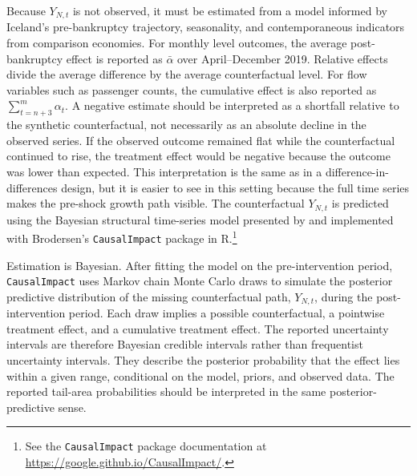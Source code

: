 \documentclass[12pt]{article}
\begin{document}
Because $Y_{N,t}$ is not observed, it must be estimated from a model informed by Iceland's pre-bankruptcy trajectory, seasonality, and contemporaneous indicators from comparison economies. For monthly level outcomes, the average post-bankruptcy effect is reported as $\bar{\alpha}$ over April--December 2019. Relative effects divide the average difference by the average counterfactual level. For flow variables such as passenger counts, the cumulative effect is also reported as $\sum_{t=n+3}^{m} \alpha_t$. A negative estimate should be interpreted as a shortfall relative to the synthetic counterfactual, not necessarily as an absolute decline in the observed series. If the observed outcome remained flat while the counterfactual continued to rise, the treatment effect would be negative because the outcome was lower than expected. This interpretation is the same as in a difference-in-differences design, but it is easier to see in this setting because the full time series makes the pre-shock growth path visible. The counterfactual $Y_{N,t}$ is predicted using the Bayesian structural time-series model presented by \citet{brodersen_2015_inferring} and implemented with Brodersen's \texttt{CausalImpact} package in R.\footnote{See the \texttt{CausalImpact} package documentation at \url{https://google.github.io/CausalImpact/}.}

Estimation is Bayesian. After fitting the model on the pre-intervention period, \texttt{CausalImpact} uses Markov chain Monte Carlo draws to simulate the posterior predictive distribution of the missing counterfactual path, $Y_{N,t}$, during the post-intervention period. Each draw implies a possible counterfactual, a pointwise treatment effect, and a cumulative treatment effect. The reported uncertainty intervals are therefore Bayesian credible intervals rather than frequentist uncertainty intervals. They describe the posterior probability that the effect lies within a given range, conditional on the model, priors, and observed data. The reported tail-area probabilities should be interpreted in the same posterior-predictive sense.
\end{document}
